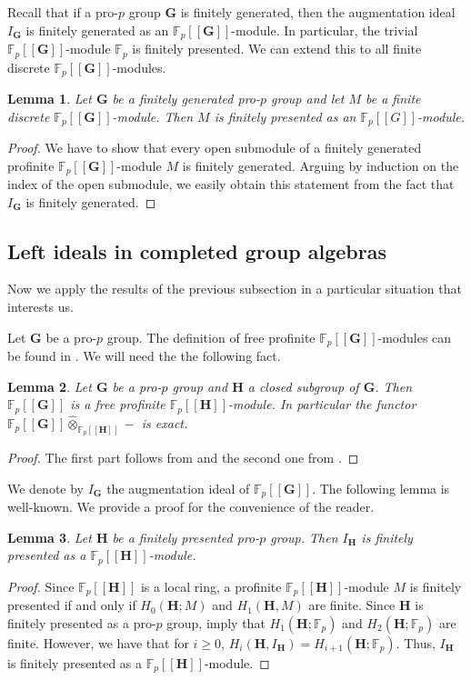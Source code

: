 \documentclass[11pt]{amsart}
\newtheorem{lem}{Lemma}[section]
\numberwithin{claimcounter}{lem}
\newcommand{\F}{\mathbb{F}}
\begin{document}
 Recall that if a pro-$p$ group $\mathbf G$  is finitely generated, then the augmentation ideal $I_{\mathbf G}$ is finitely generated as an $\F_p[[\mathbf G]]$-module. In particular, the trivial $\F_p[[\mathbf G]]$-module $\F_p$ is finitely presented. We can extend this to all  finite discrete $\F_p[[\mathbf G]]$-modules. 
   \begin{lem} \label{finitediscrete}
   Let $\mathbf G$ be a finitely generated pro-$p$ group and let $M$ be a  finite discrete $\F_p[[\mathbf G]]$-module. Then $M$ is   finitely presented as an $\F_p[[G]]$-module.
   \end{lem}
   \begin{proof} We have to show that every open submodule  of a finitely generated profinite $\F_p[[\mathbf G]]$-module $M$ is finitely generated. Arguing by induction on the index of the open submodule, we easily obtain this statement from the fact that $I_{\mathbf G}$ is finitely generated.
   \end{proof}

  \subsection{Left ideals in    completed group algebras}
  Now we apply the results of the previous subsection in a particular situation that interests us.
 
Let $\mathbf G$ be a  pro-$p$ group.     
 The definition of free profinite $\F_p[[\mathbf G]]$-modules can be found in \cite[Section 5.2]{RZ10}. We will  need the the following fact.
 
 \begin{lem}\label{freemodule}
 Let $\mathbf G$ be a  pro-$p$ group and $\mathbf H$ a closed subgroup of $\mathbf G$. Then $\F_p[[\mathbf G]]$ is a free profinite $\F_p[[\mathbf H]]$-module. In particular the functor $\F_p[[\mathbf G]]\widehat \otimes_{\F_p[[\mathbf H]]}-$ is exact.
 \end{lem}
 \begin{proof}
 The first part follows from \cite[Corollary 5.7.2]{RZ10} and the second  one from \cite[Proposition 5.5.3 (e)]{RZ10}. 
 \end{proof}
We denote by $I_\mathbf G$ the augmentation ideal of $\F_p[[\mathbf G]]$.  The following lemma is well-known. We provide a proof for the convenience of the reader.
\begin{lem}\label{finitepresent}
Let $\mathbf H$ be a finitely  presented   pro-$p$ group. Then $I_\mathbf H$ is finitely presented as a $\F_p[[\mathbf H]]$-module.
\end{lem}
\begin{proof} Since $\F_p[[\mathbf H]]$ is a local ring, a profinite $\F_p[[\mathbf H]]$-module $M$ is finitely presented  if and only if $H_0(\mathbf H; M)$ and $H_1(\mathbf H, M)$ are finite. Since $\mathbf H$ is finitely presented as a pro-$p$ group, \cite[Theorem 7.8.1 and Theorem 7.8.3]{RZ10} imply that $H_1(\mathbf H; \F_p)$ and $H_2(\mathbf H; \F_p)$ are finite. However, we have that for $i\ge 0$, $H_i(\mathbf H, I_{\mathbf H})=H_{i+1}(\mathbf H;\F_p)$. Thus, $I_\mathbf H$ is finitely presented as a $\F_p[[\mathbf H]]$-module.
\end{proof}
\end{document}
